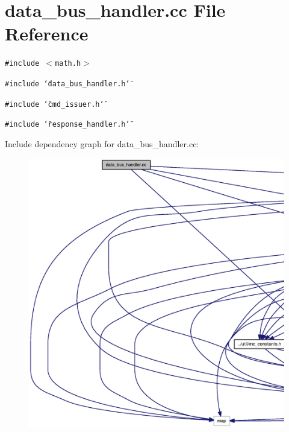 \section{data\_\-bus\_\-handler.cc File Reference}
\label{data__bus__handler_8cc}
{\tt \#include $<$math.h$>$}\par
{\tt \#include \char`\"{}data\_\-bus\_\-handler.h\char`\"{}}\par
{\tt \#include \char`\"{}cmd\_\-issuer.h\char`\"{}}\par
{\tt \#include \char`\"{}response\_\-handler.h\char`\"{}}\par


Include dependency graph for data\_\-bus\_\-handler.cc:\nopagebreak
\begin{figure}[H]
\begin{center}
\leavevmode
\includegraphics[width=420pt]{data__bus__handler_8cc__incl}
\end{center}
\end{figure}
